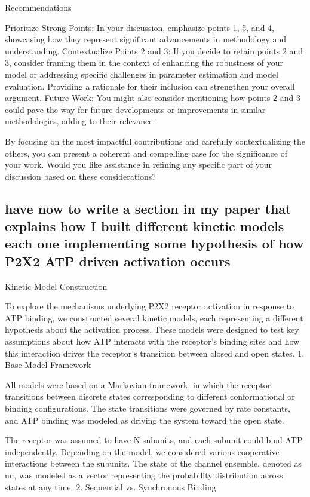 \documentclass[pdflatex,sn-mathphys-num]{sn-jnl}%
\theoremstyle{thmstyleone}%
\theoremstyle{thmstyletwo}%
\theoremstyle{thmstylethree}%
\begin{document}
Recommendations

Prioritize Strong Points: In your discussion, emphasize points 1, 5, and 4, showcasing how they represent significant advancements in methodology and understanding.
Contextualize Points 2 and 3: If you decide to retain points 2 and 3, consider framing them in the context of enhancing the robustness of your model or addressing specific challenges in parameter estimation and model evaluation. Providing a rationale for their inclusion can strengthen your overall argument.
Future Work: You might also consider mentioning how points 2 and 3 could pave the way for future developments or improvements in similar methodologies, adding to their relevance.

By focusing on the most impactful contributions and carefully contextualizing the others, you can present a coherent and compelling case for the significance of your work. Would you like assistance in refining any specific part of your discussion based on these considerations?


\subsection{ have now to write a section in my paper that explains how I built different kinetic models each one implementing some hypothesis of how P2X2 ATP driven activation occurs}

Kinetic Model Construction

To explore the mechanisms underlying P2X2 receptor activation in response to ATP binding, we constructed several kinetic models, each representing a different hypothesis about the activation process. These models were designed to test key assumptions about how ATP interacts with the receptor's binding sites and how this interaction drives the receptor's transition between closed and open states.
1. Base Model Framework

All models were based on a Markovian framework, in which the receptor transitions between discrete states corresponding to different conformational or binding configurations. The state transitions were governed by rate constants, and ATP binding was modeled as driving the system toward the open state.

The receptor was assumed to have N subunits, and each subunit could bind ATP independently. Depending on the model, we considered various cooperative interactions between the subunits. The state of the channel ensemble, denoted as nn, was modeled as a vector representing the probability distribution across states at any time.
2. Sequential vs. Synchronous Binding
\end{document}
